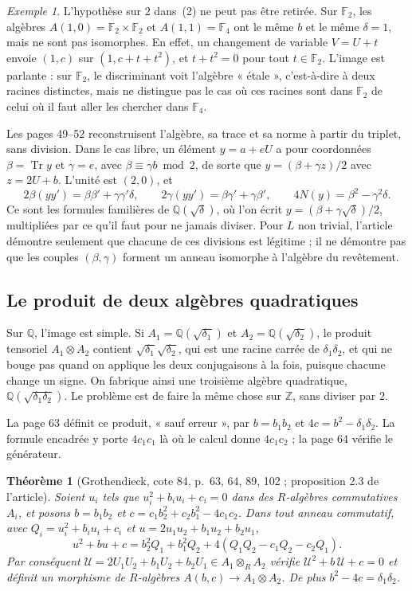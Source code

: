 \documentclass[11pt,a4paper]{amsart}
\theoremstyle{definition}
\theoremstyle{plain}
\newtheorem{theoreme}{Théorème}
\theoremstyle{remark}
\newtheorem{exemple}{Exemple}
\theoremstyle{plain}
\newcommand{\Z}{\mathbb Z}
\newcommand{\F}{\mathbb F}
\newcommand{\Q}{\mathbb Q}
\newcommand{\Tr}{\operatorname{Tr}}
\begin{document}
\begin{exemple}
L'hypothèse sur $2$ dans~(2) ne peut pas être retirée. Sur $\F_2$, les algèbres $A(1, 0) = \F_2\times\F_2$ et $A(1, 1) = \F_4$ ont le même $b$ et le même $\delta = 1$, mais ne sont pas isomorphes. En effet, un changement de variable $V = U + t$ envoie $(1, c)$ sur $(1, c + t + t^2)$, et $t + t^2 = 0$ pour tout $t \in \F_2$. L'image est parlante : sur $\F_2$, le discriminant voit l'algèbre « étale », c'est-à-dire à deux racines distinctes, mais ne distingue pas le cas où ces racines sont dans $\F_2$ de celui où il faut aller les chercher dans $\F_4$.
\end{exemple}

Les pages 49--52 reconstruisent l'algèbre, sa trace et sa norme à partir du triplet, sans division. Dans le cas libre, un élément $y = a + eU$ a pour coordonnées $\beta = \Tr y$ et $\gamma = e$, avec $\beta \equiv \gamma b \bmod 2$, de sorte que $y = (\beta + \gamma z)/2$ avec $z = 2U + b$. L'unité est $(2, 0)$, et
\[
2\beta(yy') = \beta\beta' + \gamma\gamma'\delta, \qquad 2\gamma(yy') = \beta\gamma' + \gamma\beta', \qquad 4N(y) = \beta^2 - \gamma^2\delta.
\]
Ce sont les formules familières de $\Q(\sqrt\delta)$, où l'on écrit $y = (\beta + \gamma\sqrt\delta)/2$, multipliées par ce qu'il faut pour ne jamais diviser. Pour $L$ non trivial, l'article démontre seulement que chacune de ces divisions est légitime ; il ne démontre pas que les couples $(\beta, \gamma)$ forment un anneau isomorphe à l'algèbre du revêtement.

\subsection{Le produit de deux algèbres quadratiques}

Sur $\Q$, l'image est simple. Si $A_1 = \Q(\sqrt{\delta_1})$ et $A_2 = \Q(\sqrt{\delta_2})$, le produit tensoriel $A_1\otimes A_2$ contient $\sqrt{\delta_1}\sqrt{\delta_2}$, qui est une racine carrée de $\delta_1\delta_2$, et qui ne bouge pas quand on applique les deux conjugaisons à la fois, puisque chacune change un signe. On fabrique ainsi une troisième algèbre quadratique, $\Q(\sqrt{\delta_1\delta_2})$. Le problème est de faire la même chose sur $\Z$, sans diviser par $2$.

La page 63 définit ce produit, « sauf erreur », par $b = b_1b_2$ et $4c = b^2 - \delta_1\delta_2$. La formule encadrée y porte $4c_1c_1$ là où le calcul donne $4c_1c_2$ ; la page 64 vérifie le générateur.

\begin{theoreme}[Grothendieck, cote 84, p.~63, 64, 89, 102 ; proposition 2.3 de l'article]
Soient $u_i$ tels que $u_i^2 + b_iu_i + c_i = 0$ dans des $R$-algèbres commutatives $A_i$, et posons $b = b_1b_2$ et $c = c_1b_2^2 + c_2b_1^2 - 4c_1c_2$. Dans tout anneau commutatif, avec $Q_i = u_i^2 + b_iu_i + c_i$ et $u = 2u_1u_2 + b_1u_2 + b_2u_1$,
\[
u^2 + bu + c = b_2^2Q_1 + b_1^2Q_2 + 4(Q_1Q_2 - c_1Q_2 - c_2Q_1).
\]
Par conséquent $\mathcal U = 2U_1U_2 + b_1U_2 + b_2U_1 \in A_1\otimes_R A_2$ vérifie $\mathcal U^2 + b\,\mathcal U + c = 0$ et définit un morphisme de $R$-algèbres $A(b, c) \to A_1\otimes A_2$. De plus $b^2 - 4c = \delta_1\delta_2$.
\end{theoreme}
\end{document}
